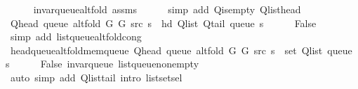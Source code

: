 \begin{isabellebody}
\ \ \ \ \isamarkupfalse%
\ invar{\isacharunderscore}{\kern0pt}queue{\isacharunderscore}{\kern0pt}alt{\isacharunderscore}{\kern0pt}fold\ assms\isanewline
\ \ \ \ \isamarkupfalse%
\ {\isacharparenleft}{\kern0pt}simp\ add{\isacharcolon}{\kern0pt}\ Q{\isachardot}{\kern0pt}is{\isacharunderscore}{\kern0pt}empty\ Q{\isachardot}{\kern0pt}list{\isacharunderscore}{\kern0pt}head{\isacharparenright}{\kern0pt}\isanewline
\ \ \isamarkupfalse%
\ {\isachardoublequoteopen}Q{\isacharunderscore}{\kern0pt}head\ {\isacharparenleft}{\kern0pt}queue\ {\isacharparenleft}{\kern0pt}alt{\isacharunderscore}{\kern0pt}fold\ G{}\ G{}\ src\ s{\isacharparenright}{\kern0pt}{\isacharparenright}{\kern0pt}\ {\isacharequal}{\kern0pt}\ hd\ {\isacharparenleft}{\kern0pt}Q{\isacharunderscore}{\kern0pt}list\ {\isacharparenleft}{\kern0pt}Q{\isacharunderscore}{\kern0pt}tail\ {\isacharparenleft}{\kern0pt}queue\ s{\isacharparenright}{\kern0pt}{\isacharparenright}{\kern0pt}{\isacharparenright}{\kern0pt}{\isachardoublequoteclose}\isanewline
\ \ \ \ \isamarkupfalse%
\ False\isanewline
\ \ \ \ \isamarkupfalse%
\ {\isacharparenleft}{\kern0pt}simp\ add{\isacharcolon}{\kern0pt}\ list{\isacharunderscore}{\kern0pt}queue{\isacharunderscore}{\kern0pt}alt{\isacharunderscore}{\kern0pt}fold{\isacharunderscore}{\kern0pt}cong{\isacharparenright}{\kern0pt}\isanewline
\ \ \isamarkupfalse%
\ head{\isacharunderscore}{\kern0pt}queue{\isacharunderscore}{\kern0pt}alt{\isacharunderscore}{\kern0pt}fold{\isacharunderscore}{\kern0pt}mem{\isacharunderscore}{\kern0pt}queue{\isacharcolon}{\kern0pt}\ {\isachardoublequoteopen}Q{\isacharunderscore}{\kern0pt}head\ {\isacharparenleft}{\kern0pt}queue\ {\isacharparenleft}{\kern0pt}alt{\isacharunderscore}{\kern0pt}fold\ G{}\ G{}\ src\ s{\isacharparenright}{\kern0pt}{\isacharparenright}{\kern0pt}\ {\isasymin}\ set\ {\isacharparenleft}{\kern0pt}Q{\isacharunderscore}{\kern0pt}list\ {\isacharparenleft}{\kern0pt}queue\ s{\isacharparenright}{\kern0pt}{\isacharparenright}{\kern0pt}{\isachardoublequoteclose}\isanewline
\ \ \ \ \isamarkupfalse%
\ False\ invar{\isacharunderscore}{\kern0pt}queue\ list{\isacharunderscore}{\kern0pt}queue{\isacharunderscore}{\kern0pt}non{\isacharunderscore}{\kern0pt}empty\isanewline
\ \ \ \ \isamarkupfalse%
\ {\isacharparenleft}{\kern0pt}auto\ simp\ add{\isacharcolon}{\kern0pt}\ Q{\isachardot}{\kern0pt}list{\isacharunderscore}{\kern0pt}tail\ intro{\isacharcolon}{\kern0pt}\ list{\isachardot}{\kern0pt}set{\isacharunderscore}{\kern0pt}sel{\isacharparenleft}{\kern0pt}{}{\isacharparenright}{\kern0pt}{\isacharparenright}{\kern0pt}\isanewline

\end{isabellebody}
